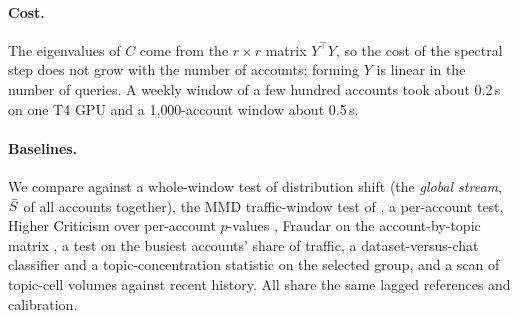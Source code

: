 \paragraph{Cost.} The eigenvalues of $C$ come from the $r\times r$ matrix $Y^\top Y$, so the cost of the spectral step does not grow with the number of accounts; forming $Y$ is linear in the number of queries. A weekly window of a few hundred accounts took about 0.2\,s on one T4 GPU and a 1{,}000-account window about 0.5\,s.

\paragraph{Baselines.} We compare against a whole-window test of distribution shift (the \emph{global stream}, $\bar S$ of all accounts together), the MMD \citep{gretton2012kernel} traffic-window test of \citet{liu2026embarrassingly}, a per-account test, Higher Criticism over per-account $p$-values \citep{donoho2004hc}, Fraudar on the account-by-topic matrix \citep{hooi2016fraudar}, a test on the busiest accounts' share of traffic, a dataset-versus-chat classifier and a topic-concentration statistic on the selected group, and a scan of topic-cell volumes against recent history. All share the same lagged references and calibration.
